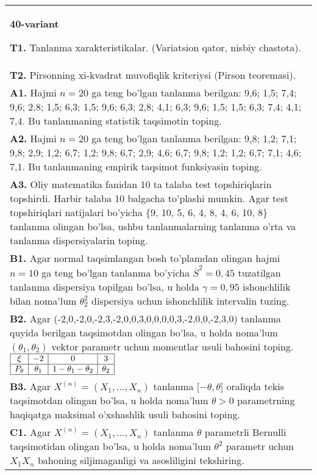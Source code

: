 \documentclass{article}
\begin{document}
\begin{tabular}{m{17cm}}
\textbf{40-variant}
\newline

\textbf{T1.} 
Tanlanma xarakteristikalar. (Variatsion qator, nisbiy chastota).
\\
\textbf{T2.} 
Pirsonning xi-kvadrat muvofiqlik kriteriysi (Pirson teoremasi).
\\
\textbf{A1.} 
Hajmi \(n = 20\) ga teng bo'lgan tanlanma berilgan: 9,6; 1,5; 7,4; 9,6; 2,8; 1,5; 6,3; 1,5; 9,6; 6,3; 2,8; 4,1; 6,3; 9,6; 1,5; 1,5; 6,3; 7,4; 4,1; 7,4. Bu tanlanmaning statistik taqsimotin toping.
\\
\textbf{A2.} 
Hajmi \(n = 20\) ga teng bo'lgan tanlanma berilgan: 9,8; 1,2; 7,1; 9,8; 2,9; 1,2; 6,7; 1,2; 9,8; 6,7; 2,9; 4,6; 6,7; 9,8; 1,2; 1,2; 6,7; 7,1; 4,6; 7,1. Bu tanlanmaning empirik taqsimot funksiyasin toping.
\\
\textbf{A3.} 
Oliy matematika fanidan 10 ta talaba test topshiriqlarin topshirdi. Harbir talaba 10 balgacha to'plashi mumkin. Agar test topshiriqlari natijalari bo'yicha \{9, 10, 5, 6, 4, 8, 4, 6, 10, 8\} tanlanma olingan bo'lsa, ushbu tanlanmalarning tanlanma o'rta va tanlanma dispersiyalarin toping.
\\
\textbf{B1.} 
Agar normal taqsimlangan bosh to'plamdan olingan hajmi \(n = 10\) ga teng bo'lgan tanlanma bo'yicha \({\overline{S}}^{2} = 0,45\) tuzatilgan tanlanma dispersiya topilgan bo'lsa, u holda \(\gamma = 0,95\) ishonchlilik bilan noma'lum \(\theta_{2}^{2}\) dispersiya uchun ishonchlilik intervalin tuzing.
\\
\textbf{B2.} 
Agar (-2,0,-2,0,-2,3,-2,0,0,3,0,0,0,0,3,-2,0,0,-2,3,0) tanlanma quyida berilgan taqsimotdan olingan bo'lsa, u holda noma'lum \(\left( \theta_{1},\theta_{2} \right)\) vektor parametr uchun momentlar usuli bahosini toping.
$\begin{array}{|c|c|c|c|}
    \hline
    \xi & - 2 & 0 & 3\\
    \hline
    P_{\theta} & \theta_{1} & 1 - \theta_{1} - \theta_{2} & \theta_{2} \\
    \hline
\end{array}$
\\
\textbf{B3.} 
Agar \(X^{(n)} = \left( X_{1},...,X_{n} \right)\) tanlanma \(\lbrack - \theta,\theta\rbrack\) oraliqda tekis taqsimotdan olingan bo'lsa, u holda noma'lum \(\theta > 0\) parametrning haqiqatga maksimal o'xshashlik usuli bahosini toping.
\\
\textbf{C1.} 
Agar \(X^{(n)} = \left( X_{1},...,X_{n} \right)\) tanlanma \(\theta\) parametrli Bernulli taqsimotidan olingan bo'lsa, u holda noma'lum \(\theta^{2}\) parametr uchun \(X_{1}X_{n}\) bahoning siljimaganligi va asosliligini tekshiring.

\end{tabular}
\end{document}
